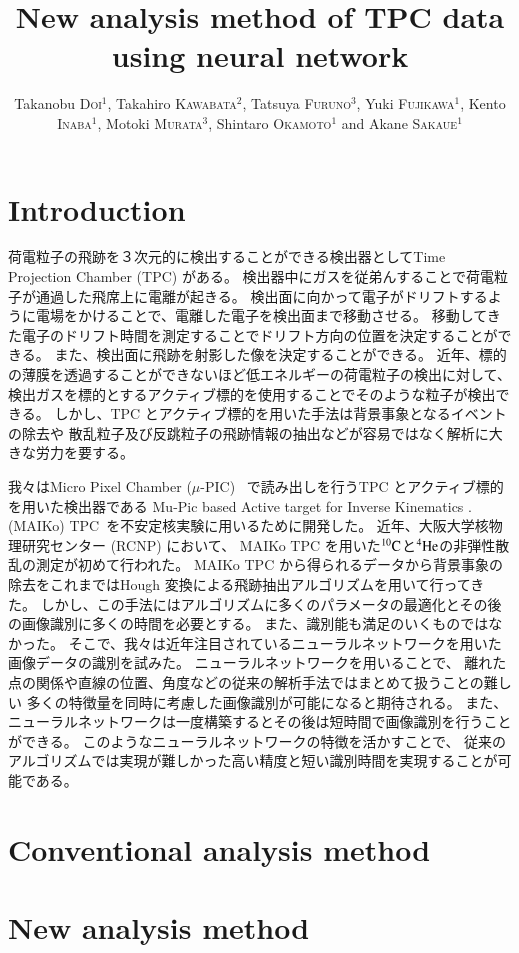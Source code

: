 \documentclass{jps-cp}
\title{New analysis method of TPC data using neural network}
\author{
  Takanobu \textsc{Doi}$^{1}$, Takahiro \textsc{Kawabata}$^{2}$, Tatsuya \textsc{Furuno}$^{3}$,
  Yuki \textsc{Fujikawa}$^{1}$, Kento \textsc{Inaba}$^{1}$, Motoki \textsc{Murata}$^{3}$,
  Shintaro \textsc{Okamoto}$^{1}$ and Akane \textsc{Sakaue}$^{1}$}
\begin{document}
\maketitle

\section{Introduction}
荷電粒子の飛跡を３次元的に検出することができる検出器としてTime Projection Chamber (TPC) がある。
検出器中にガスを従弟んすることで荷電粒子が通過した飛席上に電離が起きる。
検出面に向かって電子がドリフトするように電場をかけることで、電離した電子を検出面まで移動させる。
移動してきた電子のドリフト時間を測定することでドリフト方向の位置を決定することができる。
また、検出面に飛跡を射影した像を決定することができる。
近年、標的の薄膜を透過することができないほど低エネルギーの荷電粒子の検出に対して、
検出ガスを標的とするアクティブ標的を使用することでそのような粒子が検出できる。
しかし、TPC とアクティブ標的を用いた手法は背景事象となるイベントの除去や
散乱粒子及び反跳粒子の飛跡情報の抽出などが容易ではなく解析に大きな労力を要する。

我々はMicro Pixel Chamber ($\mu$-PIC)~\cite{mupic} で読み出しを行うTPC とアクティブ標的を用いた検出器である
Mu-Pic based Active target for Inverse Kinematics . (MAIKo) TPC~\cite{MAIKo}を不安定核実験に用いるために開発した。
近年、大阪大学核物理研究センター (RCNP) において、
MAIKo TPC を用いた${}^{10}\rm{C}$と${}^{4}\rm{He}$の非弾性散乱の測定が初めて行われた。
MAIKo TPC から得られるデータから背景事象の除去をこれまではHough 変換による飛跡抽出アルゴリズムを用いて行ってきた。
しかし、この手法にはアルゴリズムに多くのパラメータの最適化とその後の画像識別に多くの時間を必要とする。
また、識別能も満足のいくものではなかった。
そこで、我々は近年注目されているニューラルネットワークを用いた画像データの識別を試みた。
ニューラルネットワークを用いることで、
離れた点の関係や直線の位置、角度などの従来の解析手法ではまとめて扱うことの難しい
多くの特徴量を同時に考慮した画像識別が可能になると期待される。
また、ニューラルネットワークは一度構築するとその後は短時間で画像識別を行うことができる。
このようなニューラルネットワークの特徴を活かすことで、
従来のアルゴリズムでは実現が難しかった高い精度と短い識別時間を実現することが可能である。

\section{Conventional analysis method}

\section{New analysis method}
\end{document}
